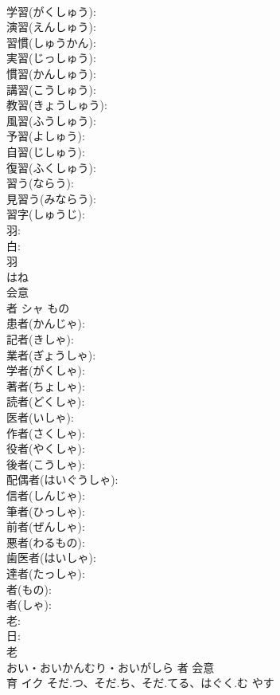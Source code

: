 \documentclass[8pt]{extreport}
\begin{document}
\begin{CJK}{UTF8}{min}
\\	学習(がくしゅう): 
\\	演習(えんしゅう): 
\\	習慣(しゅうかん): 
\\	実習(じっしゅう): 
\\	慣習(かんしゅう): 
\\	講習(こうしゅう): 
\\	教習(きょうしゅう): 
\\	風習(ふうしゅう): 
\\	予習(よしゅう): 
\\	自習(じしゅう): 
\\	復習(ふくしゅう): 
\\	習う(ならう): 
\\	見習う(みならう): 
\\	習字(しゅうじ): 
\\	羽: 
\\	白: 
\\	羽	
\\	はね	
\\	会意 
\\	者	シャ	もの		
\\	患者(かんじゃ): 
\\	記者(きしゃ): 
\\	業者(ぎょうしゃ): 
\\	学者(がくしゃ): 
\\	著者(ちょしゃ): 
\\	読者(どくしゃ): 
\\	医者(いしゃ): 
\\	作者(さくしゃ): 
\\	役者(やくしゃ): 
\\	後者(こうしゃ): 
\\	配偶者(はいぐうしゃ): 
\\	信者(しんじゃ): 
\\	筆者(ひっしゃ): 
\\	前者(ぜんしゃ): 
\\	悪者(わるもの): 
\\	歯医者(はいしゃ): 
\\	達者(たっしゃ): 
\\	者(もの): 
\\	者(しゃ): 
\\	老: 
\\	日: 
\\	老	
\\	おい・おいかんむり・おいがしら	者	会意 
\\	育	イク	そだ.つ、そだ.ち、そだ.てる、はぐく.む	やす	

\end{CJK}
\end{document}
